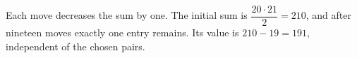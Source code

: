 Each move decreases the sum by one. The initial sum is $\dfrac{20\cdot21}{2}=210$, and after nineteen moves exactly one entry remains. Its value is $210-19=\boxed{191}$, independent of the chosen pairs.
